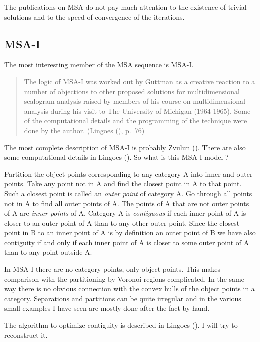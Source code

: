 \documentclass[
  12pt,
  letterpaper,
  DIV=11,
  numbers=noendperiod]{scrartcl}
\begin{document}
The publications on MSA do not pay much attention to the existence of
trivial solutions and to the speed of convergence of the iterations.

\subsection{MSA-I}\label{msa-i}

The most interesting member of the MSA sequence is MSA-I.

\begin{quote}
The logic of MSA-I was worked out by Guttman as a creative reaction to a
number of objections to other proposed solutions for multidimensional
scalogram analysis raised by members of his course on multidimensional
analysis during his visit to The University of Michigan (1964-1965).
Some of the computational details and the programming of the technique
were done by the author. (Lingoes (),
p.~76)
\end{quote}

The most complete description of MSA-I is probably Zvulun
(). There are also some computational
details in Lingoes (). So what is this
MSA-I model ?

Partition the object points corresponding to any category A into inner
and outer points. Take any point not in A and find the closest point in
A to that point. Such a closest point is called an \emph{outer point} of
category A. Go through all points not in A to find all outer points of
A. The points of A that are not outer points of A are \emph{inner
points} of A. Category A is \emph{contiguous} if each inner point of A
is closer to an outer point of A than to any other outer point. Since
the closest point in B to an inner point of A is by definition an outer
point of B we have also contiguity if and only if each inner point of A
is closer to some outer point of A than to any point outside A.

In MSA-I there are no category points, only object points. This makes
comparison with the partitioning by Voronoi regions complicated. In the
same way there is no obvious connection with the convex hulls of the
object points in a category. Separations and partitions can be quite
irregular and in the various small examples I have seen are mostly done
after the fact by hand.

The algorithm to optimize contiguity is described in Lingoes
(). I will try to reconstruct it.
\end{document}

